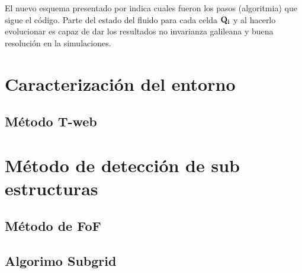 El nuevo esquema presentado por \cite{springel2010} indica cuales fueron los pasos (algoritmia) que sigue el código. Parte del estado del fluido para cada celda ${\bf{Q_{i}}}$ y al hacerlo evolucionar es capaz de dar los resultados no invarianza galileana y buena resolución en la simulaciones. 

\section{Caracterización del entorno}
\label{sec: Caracterizacion entorno}

    \subsection{Método T-web}
    \label{subsec: Metodo_T-web}



\section{Método de detección de sub estructuras}
\label{sec: detección sub-estructuras}

    \subsection{Método de FoF}
    \label{subsec: FoF}


    \subsection{Algorimo Subgrid}
    \label{subsec: Algoritmo subgrid}


















